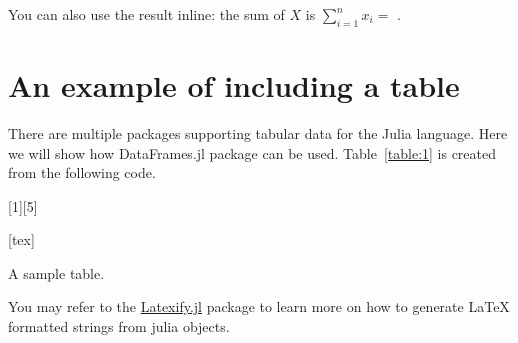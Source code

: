 \documentclass[11pt]{article}
\begin{document}
You can also use the result inline: the sum of $X$ is $\sum_{i=1}^nx_i=$ .

\section{An example of including a table}
There are multiple packages supporting tabular data for the Julia language.
Here we will show how DataFrames.jl package can be used.
Table~\ref{table:1} is created from the following code.

[1][5]
\begin{table}[H]
  \centering
  [tex]
  \caption{A sample table.}
\label{table:1}
\end{table}

You may refer to the \href{https://github.com/korsbo/Latexify.jl}{Latexify.jl} package to learn more on how to generate LaTeX formatted strings from julia objects.


  
\end{document}
